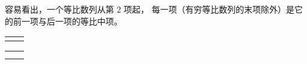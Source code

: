 容易看出，一个等比数列从第 $2$ 项起， 每一项（有穷等比数列的末项除外）是它的前一项与后一项的等比中项。

\lianxi

\begin{xiaotis}


\begin{xiaoxiaotis}

    \renewcommand\arraystretch{1.5}
    \begin{tabular}[t]{*{2}{@{}p{16em}}}
         & 
    \end{tabular}

\end{xiaoxiaotis}

\begin{xiaoxiaotis}

    \renewcommand\arraystretch{1.5}
    \begin{tabular}[t]{*{2}{@{}p{16em}}}
         &  \\
         & 
    \end{tabular}

\end{xiaoxiaotis}


\xiaoti{}
\begin{xiaoxiaotis}

    \vspace{-1.6em} \begin{minipage}{0.9\textwidth}
    \end{minipage}


\end{xiaoxiaotis}

\xiaoti{}
\begin{xiaoxiaotis}

    \vspace{-1.6em} \begin{minipage}{0.9\textwidth}
    \end{minipage}


\end{xiaoxiaotis}

\end{xiaotis}

